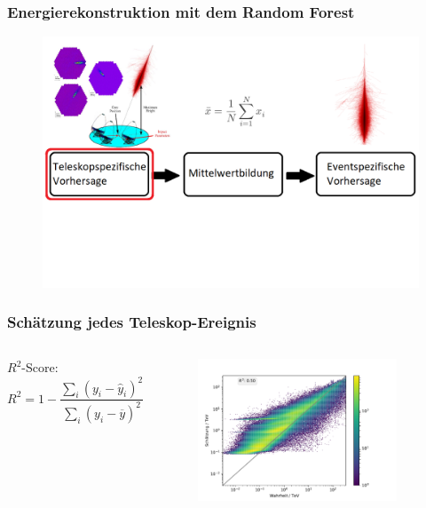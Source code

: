 \documentclass[aspectratio=1610, professionalfonts, 9pt]{beamer}
\begin{document}
  \begin{frame}
    \frametitle{Energierekonstruktion mit dem Random Forest}
    \begin{figure}
      \includegraphics[width=\textwidth]{pictures/Ablauf10.png}
      \caption{}
      \label{}
    \end{figure}
  \end{frame}

  \begin{frame}
    \frametitle{Schätzung jedes Teleskop-Ereignis}
    \begin{columns}
          $R^2$-Score:
          \begin{equation*}
            R^2 = 1 - \frac{\sum_i (y_i-\hat{y}_i)^2}{\sum_i (y_i - \overline{y})^2}
          \end{equation*}
      \begin{figure}
        \includegraphics[width=0.9\textwidth]{pictures/RF.pdf}
        \caption{}
        \label{}
      \end{figure}
    \end{columns}
  \end{frame}
\end{document}
